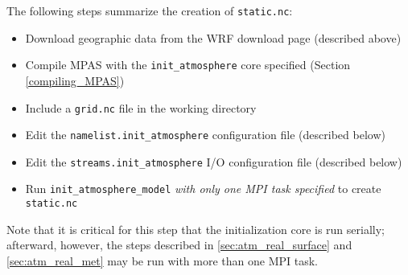 The following steps summarize the creation of {\tt static.nc}:

\begin{itemize}
\item Download geographic data from the WRF download page (described above) 
\item Compile MPAS with the {\tt init\_atmosphere} core specified (Section \ref{compiling_MPAS})
\item Include a {\tt grid.nc} file in the working directory
\item Edit the {\tt namelist.init\_atmosphere} configuration file (described below)
\item Edit the {\tt streams.init\_atmosphere} I/O configuration file (described below)
\item Run {\tt init\_atmosphere\_model} {\em with only one MPI task specified} to create {\tt static.nc}
\end{itemize}
Note that it is critical for this step that the initialization core is run serially; afterward, however, the steps described in \ref{sec:atm_real_surface} and \ref{sec:atm_real_met} may be run with more than one MPI task.


